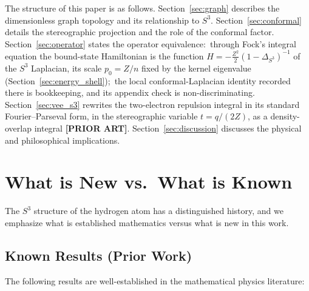 \documentclass[aps,pra,twocolumn,superscriptaddress,longbibliography]{revtex4-2}
\begin{document}
The structure of this paper is as follows. Section~\ref{sec:graph} describes the dimensionless graph topology and its relationship to $S^3$. Section~\ref{sec:conformal} details the stereographic projection and the role of the conformal factor. Section~\ref{sec:operator} states the operator equivalence:\ through Fock's integral equation the bound-state Hamiltonian is the function $H = -\tfrac{Z^2}{2}(1-\Delta_{S^3})^{-1}$ of the $S^3$ Laplacian, its scale $p_0 = Z/n$ fixed by the kernel eigenvalue (Section~\ref{sec:energy_shell});\ the local conformal-Laplacian identity recorded there is bookkeeping, and its appendix check is non-discriminating. Section~\ref{sec:vee_s3} rewrites the two-electron repulsion integral in its standard Fourier--Parseval form, in the stereographic variable $t = q/(2Z)$, as a density-overlap integral \textbf{[PRIOR ART]}. Section~\ref{sec:discussion} discusses the physical and philosophical implications.


\section{What is New vs.\ What is Known}
\label{sec:attribution}

The $S^3$ structure of the hydrogen atom has a distinguished history, and we emphasize what is established mathematics versus what is new in this work.

\subsection{Known Results (Prior Work)}

The following results are well-established in the mathematical physics literature:
\end{document}
